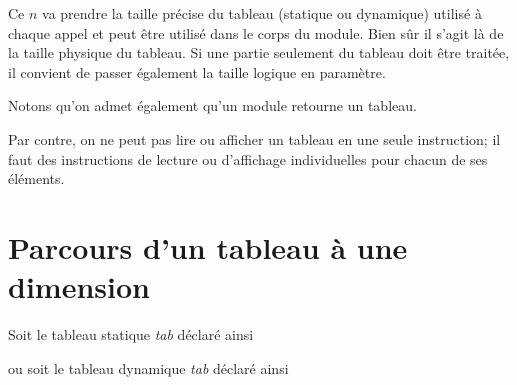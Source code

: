	Ce $n$ va prendre la taille précise du tableau
	(statique ou dynamique) utilisé à chaque appel et peut être utilisé
	dans le corps du module. Bien sûr il s’agit là de la taille physique du
	tableau. Si une partie seulement du tableau doit être traitée, il
	convient de passer également la taille logique en paramètre.
	

	Notons qu’on admet également qu’un module retourne un tableau. 
	
	
	Par contre, on ne peut pas lire ou afficher un tableau en une seule
	instruction; il faut des instructions de lecture ou
	d'affichage individuelles pour chacun de ses éléments.
	
	
\section{Parcours d'un tableau à une dimension} \label{Les parcours de tableaux}

Soit le tableau statique \textit{tab} déclaré ainsi


ou soit le tableau dynamique \textit{tab} déclaré ainsi



